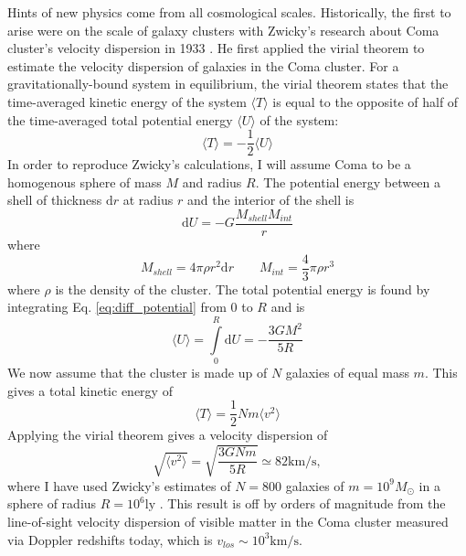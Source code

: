 Hints of new physics come from all cosmological scales. Historically, the first to arise were on the scale of galaxy clusters with Zwicky's research about Coma cluster's velocity dispersion in 1933 \cite{Zwicky_1933}. He first applied the virial theorem to estimate the velocity dispersion of galaxies in the Coma cluster. For a gravitationally-bound system in equilibrium, the virial theorem states that the time-averaged kinetic energy of the system \(\langle T \rangle \) is equal to the opposite of half of the time-averaged total potential energy \(\langle U \rangle \) of the system:
\begin{equation}\label{eq:diff_potential}
	\langle T \rangle = - \frac{1}{2} \langle U \rangle 
\end{equation}
In order to reproduce Zwicky's calculations, I will assume Coma to be a homogenous sphere of mass \(M\) and radius \(R\). The potential energy between a shell of thickness \(\mathrm{d} r\) at radius \(r\) and the interior of the shell is
\begin{equation}
	\mathrm{d} U = - G \frac{M_{shell} M_{int} }{r}
\end{equation}
where
\begin{equation}
	M_{shell} = 4\pi \rho r^2 \mathrm{d} r
	\qquad
	M_{int } = \frac{4}{3} \pi \rho r^3
\end{equation}
where \(\rho \) is the density of the cluster. The total potential energy is found by integrating Eq. \eqref{eq:diff_potential} from \(0\) to \(R\) and is
\begin{equation}\label{eq:shell_potential}
	\langle U \rangle = \int\limits_0^R \mathrm{d} U = - \frac{3GM^2}{5R}
\end{equation}
We now assume that the cluster is made up of \(N\) galaxies of equal mass \(m\). This gives a total kinetic energy of
\begin{equation}\label{eq:kinetic}
	\langle T \rangle = \frac{1}{2} Nm \langle v^2 \rangle 
\end{equation}
Applying the virial theorem gives a velocity dispersion of
\begin{equation}\label{eq:dispersion}
	\sqrt{\langle v^2 \rangle } = \sqrt{\frac{3GNm}{5R}} \simeq 82 \mathrm{km / s}, 
\end{equation}
where I have used Zwicky's estimates of \(N=800\) galaxies of \(m = 10^9 M_\odot\) in a sphere of radius \(R=10^6 \mathrm{ly} \) \cite{Bertone_2018}. This result is off by orders of magnitude from the line-of-sight velocity dispersion of visible matter in the Coma cluster measured via Doppler redshifts today, which is \(v_{los} \sim 10^3 \mathrm{km /s} \).

